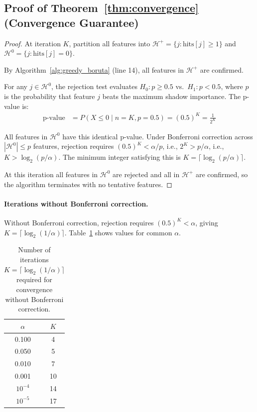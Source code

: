 \documentclass[runningheads]{llncs}
\begin{document}
\subsection{Proof of Theorem~\ref{thm:convergence} (Convergence Guarantee)}

\begin{proof}
At iteration $K$, partition all features into $\mathcal{H}^+ = \{j : \text{hits}[j] \geq 1\}$ and $\mathcal{H}^0 = \{j : \text{hits}[j] = 0\}$.

By Algorithm~\ref{alg:greedy_boruta} (line 14), all features in $\mathcal{H}^+$ are confirmed.

For any $j \in \mathcal{H}^0$, the rejection test evaluates $H_0: p \geq 0.5$ vs.\ $H_1: p < 0.5$, where $p$ is the probability that feature $j$ beats the maximum shadow importance. The p-value is:
\begin{align*}
\text{p-value} &= P(X \leq 0 \mid n = K, p = 0.5) = (0.5)^K = \frac{1}{2^K}
\end{align*}

All features in $\mathcal{H}^0$ have this identical p-value. Under Bonferroni correction across $|\mathcal{H}^0| \leq p$ features, rejection requires $(0.5)^K < \alpha/p$, i.e., $2^K > p/\alpha$, i.e., $K > \log_2(p/\alpha)$. The minimum integer satisfying this is $K = \lceil \log_2(p/\alpha) \rceil$.

At this iteration all features in $\mathcal{H}^0$ are rejected and all in $\mathcal{H}^+$ are confirmed, so the algorithm terminates with no tentative features.
\end{proof}

\paragraph{Iterations without Bonferroni correction.} Without Bonferroni correction, rejection requires $(0.5)^K < \alpha$, giving $K = \lceil \log_2(1/\alpha) \rceil$. Table~\ref{tab:iterations_alpha_no_bonf} shows values for common $\alpha$.

\begin{table}[h]
\centering
\caption{Number of iterations $K = \lceil \log_2(1/\alpha) \rceil$ required for convergence without Bonferroni correction.}
\label{tab:iterations_alpha_no_bonf}
\begin{tabular}{cc}
\toprule
$\alpha$ & $K$ \\
\midrule
0.100 & 4 \\
0.050 & 5 \\
0.010 & 7 \\
0.001 & 10 \\
$10^{-4}$ & 14 \\
$10^{-5}$ & 17 \\
\bottomrule
\end{tabular}
\end{table}
\end{document}
